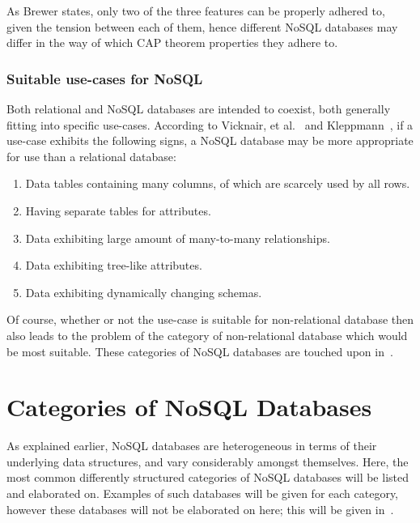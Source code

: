 \documentclass{article}
\begin{document}
As Brewer states, only two of the three features can be properly adhered to, given the tension between each of them, hence
different NoSQL databases may differ in the way of which CAP theorem properties they adhere to.

\subsubsection{Suitable use-cases for NoSQL}
\label{ssub:suitable_usecase}

Both relational and NoSQL databases are intended to coexist, both generally fitting into specific use-cases. According to
Vicknair, et al.~\cite{vicknair2010comparison} and Kleppmann~\cite{1_kleppmann_2009}, if a use-case exhibits the following 
signs, a NoSQL database may be more appropriate for use than a relational database:

\begin{enumerate}
    \item Data tables containing many columns, of which are scarcely used by all rows.
    \item Having separate tables for attributes.
    \item Data exhibiting large amount of many-to-many relationships.
    \item Data exhibiting tree-like attributes.
    \item Data exhibiting dynamically changing schemas.
\end{enumerate}

Of course, whether or not the use-case is suitable for non-relational database then also leads to the problem of the
category of non-relational database which would be most suitable. These categories of NoSQL databases are touched upon
in~.
  




\section{Categories of NoSQL Databases} %
\label{sec:categories_of_nosql_databases}

As explained earlier, NoSQL databases are heterogeneous in terms of their underlying data structures, and vary
considerably amongst themselves. Here, the most common differently structured categories of NoSQL databases will be
listed and elaborated on. Examples of such databases will be given for each category, however these databases will
not be elaborated on here; this will be given in~.
\end{document}

